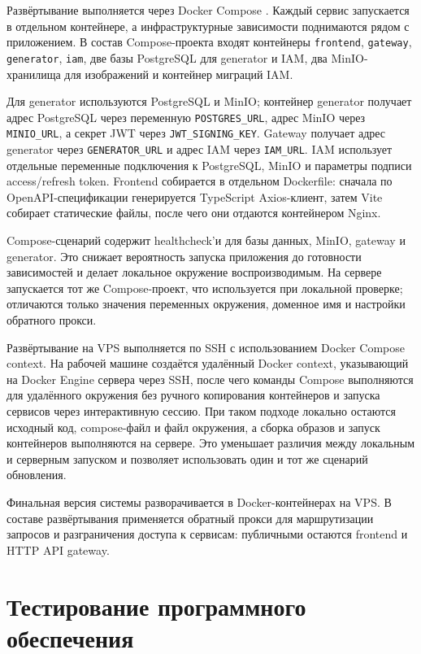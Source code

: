 Развёртывание выполняется через Docker Compose \cite{docker_compose}. Каждый сервис запускается в отдельном контейнере, а инфраструктурные зависимости поднимаются рядом с приложением. В состав Compose-проекта входят контейнеры \texttt{frontend}, \texttt{gateway}, \texttt{generator}, \texttt{iam}, две базы PostgreSQL для generator и IAM, два MinIO-хранилища для изображений и контейнер миграций IAM.

Для generator используются PostgreSQL и MinIO; контейнер generator получает адрес PostgreSQL через переменную \texttt{POSTGRES\_URL}, адрес MinIO через \texttt{MINIO\_URL}, а секрет JWT через \texttt{JWT\_SIGNING\_KEY}. Gateway получает адрес generator через \texttt{GENERATOR\_URL} и адрес IAM через \texttt{IAM\_URL}. IAM использует отдельные переменные подключения к PostgreSQL, MinIO и параметры подписи access/refresh token. Frontend собирается в отдельном Dockerfile: сначала по OpenAPI-спецификации генерируется TypeScript Axios-клиент, затем Vite собирает статические файлы, после чего они отдаются контейнером Nginx.

Compose-сценарий содержит healthcheck'и для базы данных, MinIO, gateway и generator. Это снижает вероятность запуска приложения до готовности зависимостей и делает локальное окружение воспроизводимым. На сервере запускается тот же Compose-проект, что используется при локальной проверке; отличаются только значения переменных окружения, доменное имя и настройки обратного прокси.

Развёртывание на VPS выполняется по SSH с использованием Docker Compose context. На рабочей машине создаётся удалённый Docker context, указывающий на Docker Engine сервера через SSH, после чего команды Compose выполняются для удалённого окружения без ручного копирования контейнеров и запуска сервисов через интерактивную сессию. При таком подходе локально остаются исходный код, compose-файл и файл окружения, а сборка образов и запуск контейнеров выполняются на сервере. Это уменьшает различия между локальным и серверным запуском и позволяет использовать один и тот же сценарий обновления.

Финальная версия системы разворачивается в Docker-контейнерах на VPS. В составе развёртывания применяется обратный прокси для маршрутизации запросов и разграничения доступа к сервисам: публичными остаются frontend и HTTP API gateway.

\newpage

\section{Тестирование программного обеспечения}

